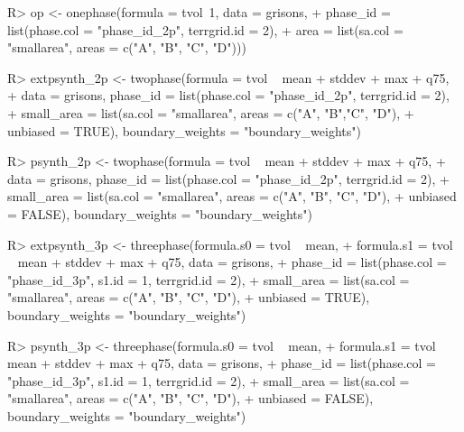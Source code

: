 \begin{small}
\begin{Schunk}
\begin{Sinput}
R> op <- onephase(formula = tvol~1, data = grisons,
+    phase_id = list(phase.col = "phase_id_2p", terrgrid.id = 2),
+    area = list(sa.col = "smallarea", areas = c("A", "B", "C", "D")))
\end{Sinput}
\end{Schunk}
\end{small}


\begin{small}
\begin{Schunk}
\begin{Sinput}
R> extpsynth_2p <- twophase(formula = tvol ~ mean + stddev + max + q75, 
+    data = grisons, phase_id = list(phase.col = "phase_id_2p", terrgrid.id = 2),
+    small_area = list(sa.col = "smallarea", areas = c("A", "B","C", "D"),
+    unbiased = TRUE), boundary_weights = "boundary_weights")
\end{Sinput}
\end{Schunk}
\end{small}

\begin{small}
\begin{Schunk}
\begin{Sinput}
R> psynth_2p <- twophase(formula = tvol ~ mean + stddev + max + q75, 
+    data = grisons, phase_id = list(phase.col = "phase_id_2p", terrgrid.id = 2),
+    small_area = list(sa.col = "smallarea", areas = c("A", "B", "C", "D"),
+    unbiased = FALSE), boundary_weights = "boundary_weights")
\end{Sinput}
\end{Schunk}
\end{small}
          
\begin{small}
\begin{Schunk}
\begin{Sinput}
R> extpsynth_3p <- threephase(formula.s0 = tvol ~ mean,
+    formula.s1 = tvol ~ mean + stddev + max + q75, data = grisons,
+    phase_id = list(phase.col = "phase_id_3p", s1.id = 1, terrgrid.id = 2),
+    small_area = list(sa.col = "smallarea", areas = c("A", "B", "C", "D"),
+    unbiased = TRUE), boundary_weights = "boundary_weights")
\end{Sinput}
\end{Schunk}
\end{small}

\begin{small}
\begin{Schunk}
\begin{Sinput}
R> psynth_3p <- threephase(formula.s0 = tvol ~ mean,
+   formula.s1 = tvol ~ mean + stddev + max + q75, data = grisons,
+   phase_id = list(phase.col = "phase_id_3p", s1.id = 1, terrgrid.id = 2),
+   small_area = list(sa.col = "smallarea", areas = c("A", "B", "C", "D"),
+   unbiased = FALSE), boundary_weights = "boundary_weights")
\end{Sinput}
\end{Schunk}
\end{small}

